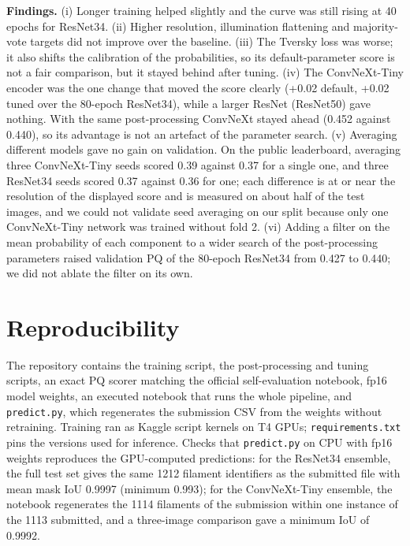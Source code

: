 \documentclass[10pt]{article}
\begin{document}
\textbf{Findings.} (i) Longer training helped slightly and the curve was still rising at 40 epochs for ResNet34.
(ii) Higher resolution, illumination flattening and majority-vote targets did not improve over the baseline.
(iii) The Tversky loss was worse; it also shifts the calibration of the probabilities, so its default-parameter score is
not a fair comparison, but it stayed behind after tuning. (iv) The ConvNeXt-Tiny encoder was the one change that moved
the score clearly (+0.02 default, +0.02 tuned over the 80-epoch ResNet34), while a larger ResNet (ResNet50) gave
nothing. With the same post-processing ConvNeXt stayed ahead (0.452 against 0.440), so its advantage is not an artefact
of the parameter search. (v) Averaging different models gave no gain on validation. On the public leaderboard, averaging
three ConvNeXt-Tiny seeds scored 0.39 against 0.37 for a single one, and three ResNet34 seeds scored 0.37 against 0.36
for one; each difference is at or near the resolution of the displayed score and is measured on about half of the test
images, and we could not validate seed averaging on our split because only one ConvNeXt-Tiny network was trained
without fold 2. (vi) Adding a filter on the mean probability of each component to a wider search of the post-processing
parameters raised validation PQ of the 80-epoch ResNet34 from 0.427 to 0.440; we did not ablate the filter on its own.

\section{Reproducibility}
The repository contains the training script, the post-processing and tuning scripts, an exact PQ scorer matching the
official self-evaluation notebook, fp16 model weights, an executed notebook that runs the whole pipeline, and
\texttt{predict.py}, which regenerates the submission CSV from the weights without retraining. Training ran as Kaggle
script kernels on T4 GPUs; \texttt{requirements.txt} pins the versions used for inference.
Checks that \texttt{predict.py} on CPU with fp16 weights reproduces the GPU-computed predictions: for the ResNet34
ensemble, the full test set gives the same 1212 filament identifiers as the submitted file with mean mask IoU 0.9997
(minimum 0.993); for the ConvNeXt-Tiny ensemble, the notebook regenerates the 1114 filaments of the submission within one
instance of the 1113 submitted, and a three-image comparison gave a minimum IoU of 0.9992.
\end{document}
